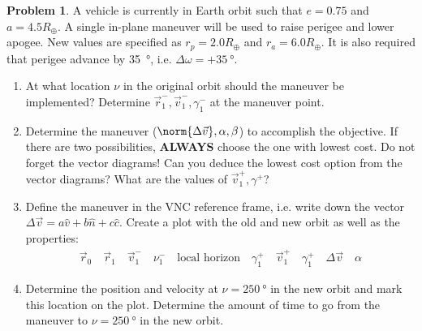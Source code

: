\documentclass[10pt]{article}
\theoremstyle{definition}
\newtheorem{prob}{Problem}[section]
\newenvironment{subprob}%
{\renewcommand{\theenumi}{\alph{enumi}}\renewcommand{\labelenumi}{(\theenumi)}\begin{enumerate}}%
{\end{enumerate}}%
\begin{document}
\begin{prob}
    A vehicle is currently in Earth orbit such that \( e = 0.75\) and \( a = 4.5 R_{\oplus} \).
    A single in-plane maneuver will be used to raise perigee and  lower apogee.
    New values are specified as \( r_p = 2.0 R_{\oplus}\) and  \( r_a = 6.0 R_{\oplus} \). 
    It is also required that perigee advance by \SI{35}{\degree}, i.e. \( \Delta \omega = + \SI{35}{\degree} \).

    \begin{subprob}
    \item At what location \( \nu \) in the original orbit should the maneuver be implemented?
        Determine \( \vec r_1^-, \vec v_1^{-}, \gamma_1^{-} \) at the maneuver point.
    \item Determine the maneuver (\( \norm{\Delta \vec v}, \alpha, \beta \)) to accomplish the objective.
        If there are two possibilities, \textbf{ALWAYS} choose the one with lowest cost. 
        Do not forget the vector diagrams!
        Can you deduce the lowest cost option  from the vector diagrams?
        What are the values of \( \vec v_1^{+}, \gamma^{+} \)?
    \item Define the maneuver in the VNC reference frame, i.e. write down the vector \( \Delta \vec v = a \hat v + b \hat n + c \hat c\).
        Create a plot with the old and new orbit as well as the properties: 
        \begin{align*}
            \vec r_0 \quad \vec r_1 \quad \vec v_1^{-} \quad \nu_1^{-} \quad \text{local horizon} \quad \gamma_1^{+} \quad \vec v_1^{+} \quad \gamma_1^{+} \quad \Delta \vec v \quad \alpha 
        \end{align*}
    \item Determine the position and velocity at \( \nu = \SI{250}{\degree} \) in the new orbit and mark this location on the plot.
        Determine the amount of time to go from the maneuver to \( \nu = \SI{250}{\degree} \) in the new orbit.
    \end{subprob}
\end{prob}
\end{document}
